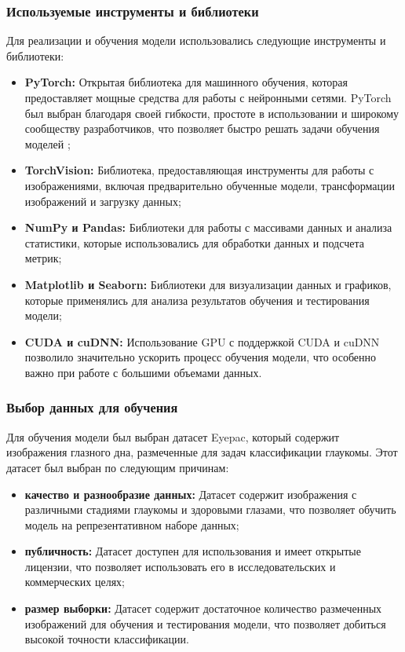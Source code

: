 {    \subsubsection*{Используемые инструменты и библиотеки}

    Для реализации и обучения модели использовались следующие инструменты и библиотеки:
    \begin{itemize}
        \item \textbf{PyTorch:} Открытая библиотека для машинного обучения, которая предоставляет мощные средства для работы с нейронными сетями. PyTorch был выбран благодаря своей гибкости, простоте в использовании и широкому сообществу разработчиков, что позволяет быстро решать задачи обучения моделей \cite{pytorch_docs};
        \item \textbf{TorchVision:} Библиотека, предоставляющая инструменты для работы с изображениями, включая предварительно обученные модели, трансформации изображений и загрузку данных;
        \item \textbf{NumPy и Pandas:} Библиотеки для работы с массивами данных и анализа статистики, которые использовались для обработки данных и подсчета метрик;
        \item \textbf{Matplotlib и Seaborn:} Библиотеки для визуализации данных и графиков, которые применялись для анализа результатов обучения и тестирования модели;
        \item \textbf{CUDA и cuDNN:} Использование GPU с поддержкой CUDA и cuDNN позволило значительно ускорить процесс обучения модели, что особенно важно при работе с большими объемами данных.
    \end{itemize}

    \subsubsection*{Выбор данных для обучения}

    Для обучения модели был выбран датасет Eyepac, который содержит изображения глазного дна, размеченные для задач классификации глаукомы. Этот датасет был выбран по следующим причинам:
    \begin{itemize}
        \item \textbf{качество и разнообразие данных:} Датасет содержит изображения с различными стадиями глаукомы и здоровыми глазами, что позволяет обучить модель на репрезентативном наборе данных;
        \item \textbf{публичность:} Датасет доступен для использования и имеет открытые лицензии, что позволяет использовать его в исследовательских и коммерческих целях;
        \item \textbf{размер выборки:} Датасет содержит достаточное количество размеченных изображений для обучения и тестирования модели, что позволяет добиться высокой точности классификации.
    \end{itemize}

}
